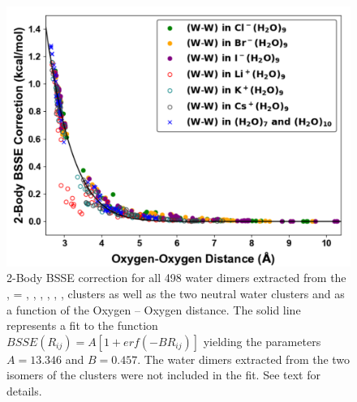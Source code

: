 \begin{figure}[t]
\uwsinglespace
\centering
\begin{adjustbox}{max size={.6\textwidth}{.6\textheight}}
\includegraphics[width=\textwidth]{Figures/Chapter_3/figure_10.pdf}
\end{adjustbox}
\begin{spacing}{1.0}
\caption[2-Body BSSE correction for all 498 water dimers extracted from the ,  = , , , , , , clusters as well as the two neutral water clusters  and  as a function of the Oxygen – Oxygen distance.]{2-Body BSSE correction for all 498 water dimers extracted from the ,  = , , , , , , clusters as well as the two neutral water clusters  and  as a function of the Oxygen – Oxygen distance. The solid line represents a fit to the function $BSSE(R_{ij})=A[1+erf(-BR_{ij})]$ yielding the parameters $A = 13.346$ and $B = 0.457$. The water dimers extracted from the two isomers of the  clusters were not included in the fit. See text for details.}\label{fig:MBE_II_10}
\end{spacing}
\end{figure}